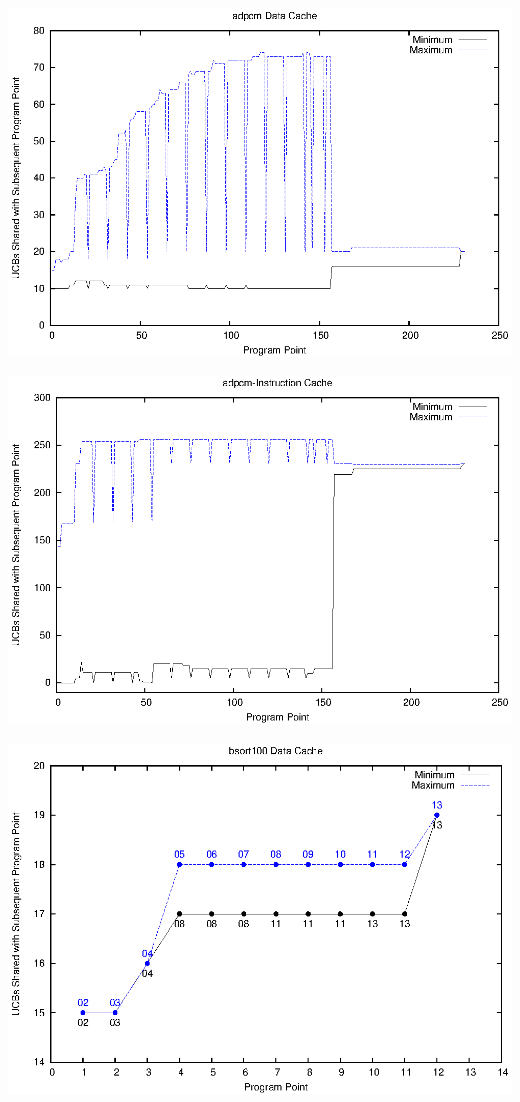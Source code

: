 \clearpage

\begin{center}
  \includegraphics[width=\linewidth]{eps/adpcm-dcache.eps}
\end{center}

\begin{center}
  \includegraphics[width=\linewidth]{eps/adpcm-icache.eps}
\end{center}

\begin{center}
  \includegraphics[width=\linewidth]{eps/bsort100-dcache.eps}
\end{center}

